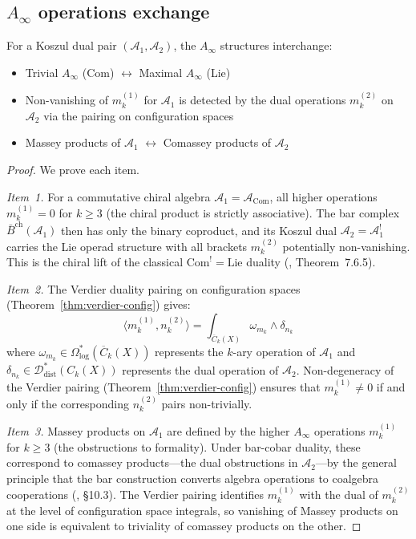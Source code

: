 \subsection{\texorpdfstring{$A_\infty$ operations exchange}{A-infinity operations exchange}}

\begin{theorem}
\label{thm:ainfty-duality-exchange}
For a Koszul dual pair $(\mathcal{A}_1, \mathcal{A}_2)$, the $A_\infty$ structures interchange:
\begin{itemize}
\item Trivial $A_\infty$ (Com) $\leftrightarrow$ Maximal $A_\infty$ (Lie)
\item Non-vanishing of $m_k^{(1)}$ for $\mathcal{A}_1$ is detected by the dual operations $m_k^{(2)}$ on $\mathcal{A}_2$ via the pairing on configuration spaces
\item Massey products of $\mathcal{A}_1$ $\leftrightarrow$ Comassey products of $\mathcal{A}_2$
\end{itemize}
\end{theorem}

\begin{proof}
We prove each item.

\emph{Item~1.}  For a commutative chiral algebra $\mathcal{A}_1 = \mathcal{A}_{\mathrm{Com}}$, all higher operations $m_k^{(1)} = 0$ for $k \geq 3$ (the chiral product is strictly associative).  The bar complex $\bar{B}^{\mathrm{ch}}(\mathcal{A}_1)$ then has only the binary coproduct, and its Koszul dual $\mathcal{A}_2 = \mathcal{A}_1^!$ carries the Lie operad structure with all brackets $m_k^{(2)}$ potentially non-vanishing.  This is the chiral lift of the classical $\mathrm{Com}^! = \mathrm{Lie}$ duality (\cite{LodayVallette}, Theorem~7.6.5).

\emph{Item~2.}  The Verdier duality pairing on configuration spaces (Theorem~\ref{thm:verdier-config}) gives:
\[
\langle m_k^{(1)}, n_k^{(2)} \rangle = \int_{\overline{C}_k(X)} \omega_{m_k} \wedge \delta_{n_k}
\]
where $\omega_{m_k} \in \Omega^*_{\log}(\overline{C}_k(X))$ represents the $k$-ary operation of $\mathcal{A}_1$ and $\delta_{n_k} \in \mathcal{D}^*_{\mathrm{dist}}(C_k(X))$ represents the dual operation of $\mathcal{A}_2$.  Non-degeneracy of the Verdier pairing (Theorem~\ref{thm:verdier-config}) ensures that $m_k^{(1)} \neq 0$ if and only if the corresponding $n_k^{(2)}$ pairs non-trivially.

\emph{Item~3.}  Massey products on $\mathcal{A}_1$ are defined by the higher $A_\infty$ operations $m_k^{(1)}$ for $k \geq 3$ (the obstructions to formality).  Under bar-cobar duality, these correspond to comassey products---the dual obstructions in $\mathcal{A}_2$---by the general principle that the bar construction converts algebra operations to coalgebra cooperations (\cite{LodayVallette}, \S10.3).  The Verdier pairing identifies $m_k^{(1)}$ with the dual of $m_k^{(2)}$ at the level of configuration space integrals, so vanishing of Massey products on one side is equivalent to triviality of comassey products on the other.
\end{proof}


